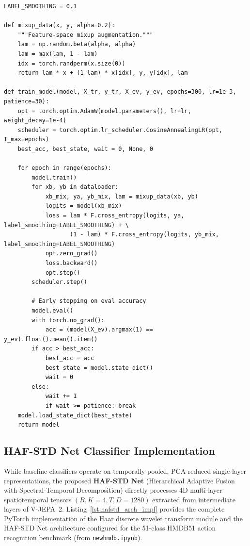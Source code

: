 \begin{lstlisting}[caption={Training loop with label smoothing, mixup augmentation, and cosine LR scheduling.}, label={lst:training_loop}]
LABEL_SMOOTHING = 0.1

def mixup_data(x, y, alpha=0.2):
    """Feature-space mixup augmentation."""
    lam = np.random.beta(alpha, alpha)
    lam = max(lam, 1 - lam)
    idx = torch.randperm(x.size(0))
    return lam * x + (1-lam) * x[idx], y, y[idx], lam

def train_model(model, X_tr, y_tr, X_ev, y_ev, epochs=300, lr=1e-3, patience=30):
    opt = torch.optim.AdamW(model.parameters(), lr=lr, weight_decay=1e-4)
    scheduler = torch.optim.lr_scheduler.CosineAnnealingLR(opt, T_max=epochs)
    best_acc, best_state, wait = 0, None, 0

    for epoch in range(epochs):
        model.train()
        for xb, yb in dataloader:
            xb_mix, ya, yb_mix, lam = mixup_data(xb, yb)
            logits = model(xb_mix)
            loss = lam * F.cross_entropy(logits, ya, label_smoothing=LABEL_SMOOTHING) + \
                   (1 - lam) * F.cross_entropy(logits, yb_mix, label_smoothing=LABEL_SMOOTHING)
            opt.zero_grad()
            loss.backward()
            opt.step()
        scheduler.step()

        # Early stopping on eval accuracy
        model.eval()
        with torch.no_grad():
            acc = (model(X_ev).argmax(1) == y_ev).float().mean().item()
        if acc > best_acc:
            best_acc = acc
            best_state = model.state_dict()
            wait = 0
        else:
            wait += 1
            if wait >= patience: break
    model.load_state_dict(best_state)
    return model
\end{lstlisting}

\subsection{HAF-STD Net Classifier Implementation}

While baseline classifiers operate on temporally pooled, PCA-reduced single-layer representations, the proposed \textbf{HAF-STD Net} (Hierarchical Adaptive Fusion with Spectral-Temporal Decomposition) directly processes 4D multi-layer spatiotemporal tensors $(B, K=4, T, D=1280)$ extracted from intermediate layers of V-JEPA~2. Listing~\ref{lst:hafstd_arch_impl} provides the complete PyTorch implementation of the Haar discrete wavelet transform module and the HAF-STD Net architecture configured for the 51-class HMDB51 action recognition benchmark (from \texttt{newhmdb.ipynb}).

